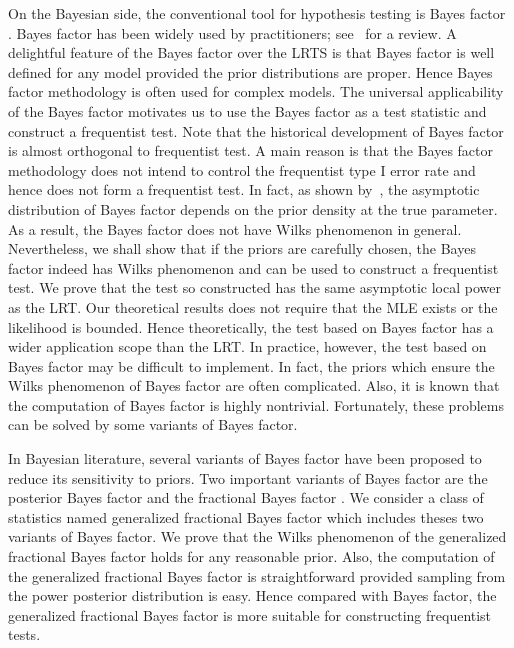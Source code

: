 \documentclass[11pt]{article}
\theoremstyle{plain}
\theoremstyle{definition}
\theoremstyle{remark}
\begin{document}

On the Bayesian side, the conventional tool for hypothesis testing is Bayes factor \citep{scientificInference}.
Bayes factor has been widely used by practitioners; see~\cite{Robert1995Bayes} for a review.
A delightful feature of the Bayes factor over the LRTS is that Bayes factor is well defined for any model provided the prior distributions are proper.
Hence Bayes factor methodology is often used for complex models.
The universal applicability of the Bayes factor motivates us to use the Bayes factor as a test statistic and construct a frequentist test.
Note that the historical development of Bayes factor is almost orthogonal to frequentist test.
A main reason is that the Bayes factor methodology does not intend to control the frequentist type I error rate and hence does not form a frequentist test.
In fact,
as shown by~\cite{clarke1990information},
the asymptotic distribution of Bayes factor depends on the prior density at the true parameter.
As a result, the Bayes factor does not have Wilks phenomenon in general.
Nevertheless, we shall show that if the priors are carefully chosen, the Bayes factor indeed has Wilks phenomenon and can be used to construct a frequentist test.
We prove that the test so constructed has the same asymptotic local power as the LRT.
Our theoretical results does not require that the MLE exists or the likelihood is bounded.
Hence theoretically, the test based on Bayes factor has a wider application scope than the LRT.
In practice, however, the test based on Bayes factor may be difficult to implement.
In fact, the priors which ensure the Wilks phenomenon of Bayes factor are often complicated.
Also, it is known that the computation of Bayes factor is highly nontrivial.
Fortunately, these problems can be solved by some variants of Bayes factor.

In Bayesian literature, several variants of Bayes factor have been proposed to reduce its sensitivity to priors.
Two important variants of Bayes factor are the posterior Bayes factor \citep{Aitkin1991Posterior} and the fractional Bayes factor \citep{Fractional1995}.
We consider a class of statistics named generalized fractional Bayes factor which includes theses two variants of Bayes factor.
We prove that the Wilks phenomenon of the generalized fractional Bayes factor holds for any reasonable prior.
Also, the computation of the generalized fractional Bayes factor is straightforward provided sampling from the power posterior distribution is easy.
Hence compared with Bayes factor, the generalized fractional Bayes factor is more suitable for constructing frequentist tests.
\end{document}
